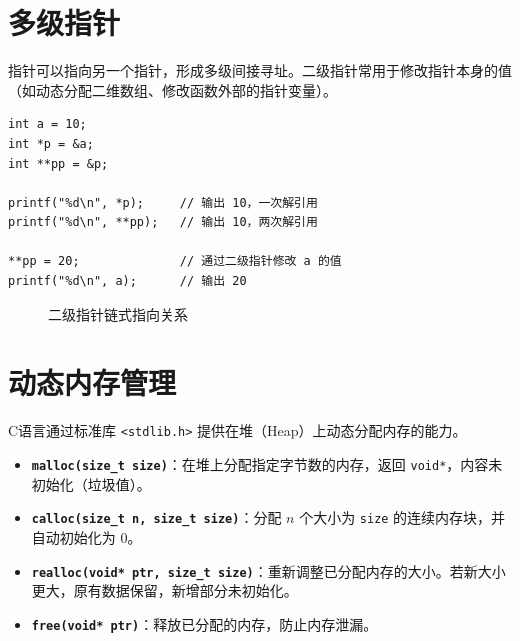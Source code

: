 \section{多级指针}

指针可以指向另一个指针，形成多级间接寻址。二级指针常用于修改指针本身的值（如动态分配二维数组、修改函数外部的指针变量）。

\begin{lstlisting}[caption={二级指针示例}]
int a = 10;
int *p = &a;
int **pp = &p;

printf("%d\n", *p);     // 输出 10，一次解引用
printf("%d\n", **pp);   // 输出 10，两次解引用

**pp = 20;              // 通过二级指针修改 a 的值
printf("%d\n", a);      // 输出 20
\end{lstlisting}

\begin{figure}[H]
\centering
{}
\caption{二级指针链式指向关系}
\label{fig:double_pointer}
\end{figure}

\section{动态内存管理}

C语言通过标准库 \texttt{<stdlib.h>} 提供在堆（Heap）上动态分配内存的能力。

\begin{itemize}
    \item \textbf{\texttt{malloc(size\_t size)}}：在堆上分配指定字节数的内存，返回 \texttt{void*}，内容未初始化（垃圾值）。
    \item \textbf{\texttt{calloc(size\_t n, size\_t size)}}：分配 $n$ 个大小为 \texttt{size} 的连续内存块，并自动初始化为 0。
    \item \textbf{\texttt{realloc(void* ptr, size\_t size)}}：重新调整已分配内存的大小。若新大小更大，原有数据保留，新增部分未初始化。
    \item \textbf{\texttt{free(void* ptr)}}：释放已分配的内存，防止内存泄漏。
\end{itemize}

